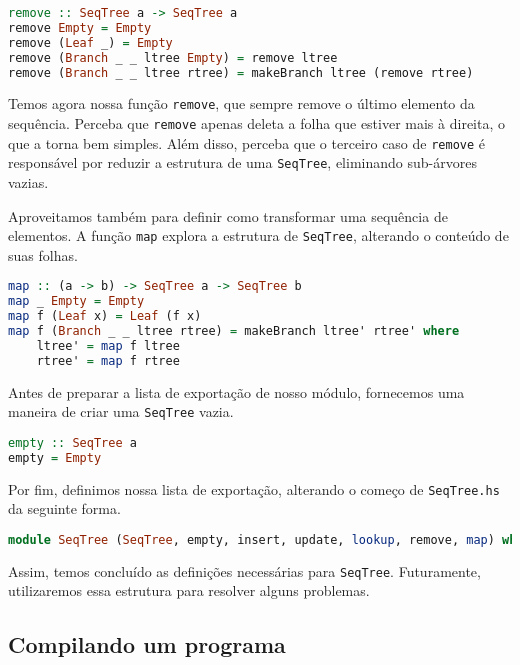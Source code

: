 \documentclass[a4paper]{article}
\begin{document}
\begin{lstlisting}[language=haskell, frame=single]
remove :: SeqTree a -> SeqTree a
remove Empty = Empty
remove (Leaf _) = Empty
remove (Branch _ _ ltree Empty) = remove ltree
remove (Branch _ _ ltree rtree) = makeBranch ltree (remove rtree)
\end{lstlisting}

Temos agora nossa função \texttt{remove}, que sempre remove o último elemento da sequência.
Perceba que \texttt{remove} apenas deleta a folha que estiver mais à direita, o que a torna bem simples.
Além disso, perceba que o terceiro caso de \texttt{remove} é responsável por reduzir a estrutura de uma \texttt{SeqTree}, eliminando sub-árvores vazias.

Aproveitamos também para definir como transformar uma sequência de elementos.
A função \texttt{map} explora a estrutura de \texttt{SeqTree}, alterando o conteúdo de suas folhas.

\begin{lstlisting}[language=haskell, frame=single]
map :: (a -> b) -> SeqTree a -> SeqTree b
map _ Empty = Empty
map f (Leaf x) = Leaf (f x)
map f (Branch _ _ ltree rtree) = makeBranch ltree' rtree' where
	ltree' = map f ltree
	rtree' = map f rtree
\end{lstlisting}

Antes de preparar a lista de exportação de nosso módulo, fornecemos uma maneira de criar uma \texttt{SeqTree} vazia.

\begin{lstlisting}[language=haskell, frame=single]
empty :: SeqTree a
empty = Empty
\end{lstlisting}

Por fim, definimos nossa lista de exportação, alterando o começo de \texttt{SeqTree.hs} da seguinte forma.

\begin{lstlisting}[language=haskell, frame=single]
module SeqTree (SeqTree, empty, insert, update, lookup, remove, map) where
\end{lstlisting}

Assim, temos concluído as definições necessárias para \texttt{SeqTree}.
Futuramente, utilizaremos essa estrutura para resolver alguns problemas.

\subsection{Compilando um programa}	\label{subsec:compiling}
\end{document}
